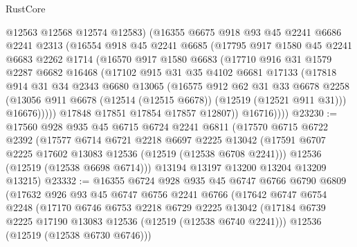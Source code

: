 \begin{lexlean}{RustCore}
\begin{coremodule}
            @12563
            @12568
            @12574
            @12583)
          (@16355
            @6675
            @918
            @93
            @45
            @2241
            @6686
            @2241
            @2313
            (@16554
              @918
              @45
              @2241
              @6685
              (@17795
                @917
                @1580
                @45
                @2241
                @6683
                @2262
                @1714
                (@16570
                  @917
                  @1580
                  @6683
                  (@17710
                    @916
                    @31
                    @1579
                    @2287
                    @6682
                    @16468
                    (@17102
                      @915
                      @31
                      @35
                      @4102
                      @6681
                      @17133
                      (@17818
                        @914
                        @31
                        @34
                        @2343
                        @6680
                        @13065
                        (@16575
                          @912
                          @62
                          @31
                          @33
                          @6678
                          @2258
                          (@13056 @911 @6678 (@12514 (@12515 @6678)) (@12519 (@12521 @911 @31)))
                          @16676)))))
                @17848
                @17851
                @17854
                @17857
                @12807))
            @16716))))
@23230 := @17560
    @928
    @935
    @45
    @6715
    @6724
    @2241
    @6811
    (@17570
      @6715
      @6722
      @2392
      (@17577
        @6714
        @6721
        @2218
        @6697
        @2225
        @13042
        (@17591 @6707 @2225 @17602 @13083 @12536 (@12519 (@12538 @6708 @2241)))
        @12536
        (@12519 (@12538 @6698 @6714)))
      @13194
      @13197
      @13200
      @13204
      @13209
      @13215)
@23332 := @16355
    @6724
    @928
    @935
    @45
    @6747
    @6766
    @6790
    @6809
    (@17632
      @926
      @93
      @45
      @6747
      @6756
      @2241
      @6766
      (@17642
        @6747
        @6754
        @2248
        (@17170
          @6746
          @6753
          @2218
          @6729
          @2225
          @13042
          (@17184 @6739 @2225 @17190 @13083 @12536 (@12519 (@12538 @6740 @2241)))
          @12536
          (@12519 (@12538 @6730 @6746)))

\end{coremodule}
\end{lexlean}
